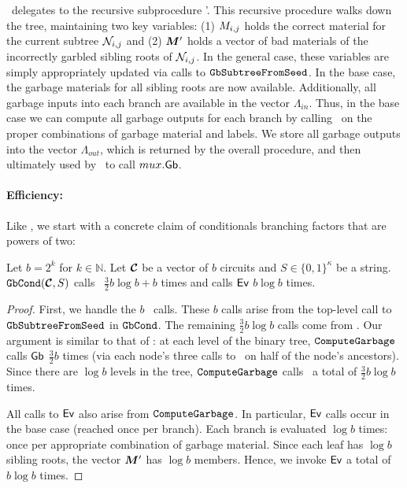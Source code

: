 \computegarbage\ delegates to the recursive subprocedure
\computegarbage'. This recursive procedure walks down the tree,
maintaining two key variables: (1) $M_{i,j}$ holds the correct
material for the current subtree $\mathtt{\cal N}_{i,j}$ and (2) $\vec{\mat}'$
holds a vector of bad materials of the incorrectly garbled sibling
roots of $\mathtt{\cal N}_{i,j}$.
%
In the general case, these variables are simply appropriately updated
via calls to $\mathtt{GbSubtreeFromSeed}$.
In the base case, the garbage materials for all sibling roots are now
available.
Additionally, all garbage inputs into each branch are available in the
vector $\Lambda_{in}$.
%
Thus, in the base case we can compute all garbage outputs for each
branch by calling \gEv\ on the proper combinations of garbage material
and labels.
%
We store all garbage outputs into the vector $\Lambda_{out}$, which is
returned by the overall procedure, and then ultimately used by
\gbcond\ to call $mux.\textsf{Gb}$.

\paragraph{Efficiency:} Like \evcond, we start with a concrete claim
of conditionals branching factors that are powers of two:
\begin{lemma}\label{lemma:gbcondtime}
  Let $b = 2^k$ for $k \in \mathbb{N}$.
  Let $\vec{\cir}$ be a vector of $b$ circuits and $S \in \{0,
  1\}^\kappa$ be a string.
  $\gbcond(\vec{\cir}, S)$ calls \gGb\ $\frac{3}{2}b \log b + b$ times and calls
  $\textsf{Ev}$ $b\log b$ times.
\end{lemma}
\begin{proof}
  First, we handle the $b$ \gGb\ calls. These $b$ calls arise from the
  top-level call to $\mathtt{GbSubtreeFromSeed}$ in $\mathtt{GbCond}$.
  The remaining $\frac{3}{2} b \log b$ calls come from
  \computegarbage.
  Our argument is similar to that of :
  at each level of the binary tree, $\mathtt{ComputeGarbage}$ calls
  $\textsf{Gb}$ $\frac{3}{2}b$ times (via each node's three calls to \gbtree\
  on half of the node's ancestors).
  Since there are $\log b$ levels in the tree, $\mathtt{ComputeGarbage}$ calls
  \gGb\ a total of $\frac{3}{2}b \log b$ times.

  All calls to $\textsf{Ev}$ also arise from $\mathtt{ComputeGarbage}$.
  In particular, $\textsf{Ev}$ calls occur in the base case (reached once per
  branch).
  Each branch is evaluated $\log b$ times: once per appropriate
  combination of garbage material. Since each leaf has $\log b$
  sibling roots, the vector $\vec{\mat}'$ has $\log b$ members.
  Hence, we invoke $\textsf{Ev}$ a total of $b \log b$ times.
\end{proof}

